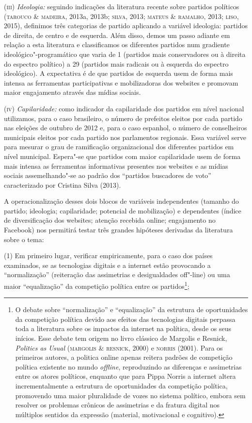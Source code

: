 (\textsc{iii}) \emph{Ideologia:} seguindo indicações da literatura
recente sobre partidos políticos (\textsc{tarouco} \& \textsc{madeira}, 2013a, 2013b;
\textsc{silva}, 2013; \textsc{mateus} \& \textsc{ramalho}, 2013; \textsc{liso}, 2015), definimos três
categorias de partido aplicando a variável ideologia: partidos de
direita, de centro e de esquerda. Além disso, demos um passo adiante em
relação a esta literatura e classificamos os diferentes partidos num
gradiente ideológico"-programático que varia de 1 (partidos mais
conservadores ou à direita do espectro político) a 29 (partidos mais
radicais ou à esquerda do espectro ideológico). A expectativa é de que
partidos de esquerda usem de forma mais intensa as ferramentas
participativas e mobilizadoras dos websites e promovam maior engajamento
através das mídias sociais.

(\textsc{iv}) \emph{Capilaridade:} como indicador da capilaridade dos partidos
em nível nacional utilizamos, para o caso brasileiro, o número de
prefeitos eleitos por cada partido nas eleições de outubro de 2012 e,
para o caso espanhol, o número de conselheiros municipais eleitos por
cada partido nos parlamentos regionais. Essa variável serve para mesurar
o grau de ramificação organizacional dos diferentes partidos em nível
municipal. Espera"-se que partidos com maior capilaridade usem de forma
mais intensa as ferramentas informativas presentes nos websites e as
mídias sociais assemelhando"-se ao padrão dos ``partidos buscadores de
voto'' caracterizado por Cristina Silva (2013).

A operacionalização desses dois blocos de variáveis independentes
(tamanho do partido; ideologia; capilaridade; potencial de mobilização)
e dependentes (índice de diversificação dos websites; atenção recebida
online; engajamento no Facebook) nos permitirá testar três grandes
hipóteses derivadas da literatura sobre o tema:

(1) Em primeiro lugar, verificar empiricamente, para o caso dos países
examinados, se as tecnologias digitais e a internet estão provocando a
``normalização'' (reiteração das assimetrias e desigualdades off"-line)
ou uma maior ``equalização'' da competição política entre os
partidos\footnote{O debate sobre ``normalização'' e ``equalização'' da
  estrutura de oportunidades da competição política devido aos efeitos
  das tecnologias digitais perpassa toda a literatura sobre os impactos
  da internet na política, desde os seus inícios. Esse debate tem origem
  no livro clássico de Margolis e Resnick, \emph{Politics as Usual}
  (\textsc{margolis} \& \textsc{resnick}, 2000) e \textsc{norris} (2001). Para os primeiros
  autores, a politica online apenas reitera padrões de competição
  política existente no mundo \emph{offline}, reproduzindo as diferenças
  e assimetrias entre os atores políticos, enquanto que para Pippa
  Norris a internet altera incrementalmente a estrutura de oportunidades
  da competição política, promovendo uma maior pluralidade de vozes no
  sistema político, embora sem resolver os problemas crônicos de
  assimetrias e da fratura digital nos múltiplos sentidos da expressão
  (material, motivacional e cognitivo).};

